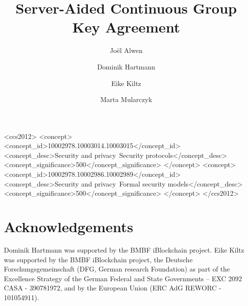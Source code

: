 \documentclass[sigconf]{acmart}
\begin{document}
\title{Server-Aided Continuous Group Key Agreement}

\author{Joël Alwen}
\author{Dominik Hartmann}
\author{Eike Kiltz}
\author{Marta Mularczyk}
\renewcommand{\shortauthors}{Alwen et al.}

\begin{abstract}

\end{abstract}

\begin{CCSXML}
<ccs2012>
   <concept>
       <concept_id>10002978.10003014.10003015</concept_id>
       <concept_desc>Security and privacy~Security protocols</concept_desc>
       <concept_significance>500</concept_significance>
       </concept>
   <concept>
       <concept_id>10002978.10002986.10002989</concept_id>
       <concept_desc>Security and privacy~Formal security models</concept_desc>
       <concept_significance>500</concept_significance>
       </concept>
 </ccs2012>
\end{CCSXML}



\maketitle




% 
% 






\section*{Acknowledgements}
Dominik Hartmann was supported by the BMBF iBlockchain project.
Eike Kiltz was supported by the BMBF iBlockchain project, the Deutsche Forschungsgemeinschaft (DFG, German research Foundation) as part of the Excellence Strategy of the German Federal and State Governments – EXC 2092 CASA - 390781972, and by the European Union (ERC AdG REWORC - 101054911).
\end{document}
